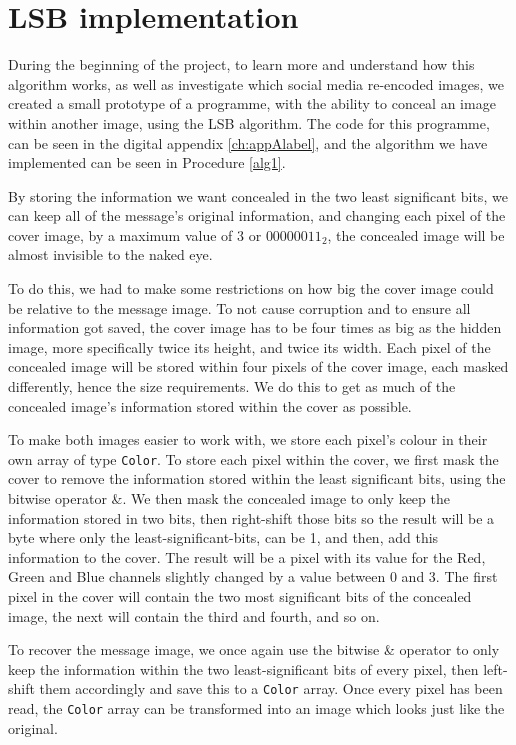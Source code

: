 \section{LSB implementation}
\label{sec:lsb-implementation}
During the beginning of the project, to learn more and understand how this algorithm works, as well as investigate which social media re-encoded images, we created a small prototype of a programme, with the ability to conceal an image within another image, using the LSB algorithm. The code for this programme, can be seen in the digital appendix \ref{ch:appAlabel}, and the algorithm we have implemented can be seen in Procedure \ref{alg1}.

By storing the information we want concealed in the two least significant bits, we can keep all of the message's original information, and changing each pixel of the cover image, by a maximum value of 3 or $00000011_2$, the concealed image will be almost invisible to the naked eye.

To do this, we had to make some restrictions on how big the cover image could be relative to the message image. 
To not cause corruption and to ensure all information got saved, the cover image has to be four times as big as the hidden image, more specifically twice its height, and twice its width. 
Each pixel of the concealed image will be stored within four pixels of the cover image, each masked differently, hence the size requirements. 
We do this to get as much of the concealed image's information stored within the cover as possible.

To make both images easier to work with, we store each pixel's colour in their own array of type \lstinline|Color|.
To store each pixel within the cover, we first mask the cover to remove the information stored within the least significant bits, using the bitwise operator \&.
We then mask the concealed image to only keep the information stored in two bits, then right-shift those bits so the result will be a byte where only the least-significant-bits, can be 1, and then, add this information to the cover. 
The result will be a pixel with its value for the Red, Green and Blue channels slightly changed by a value between 0 and 3.
The first pixel in the cover will contain the two most significant bits of the concealed image, the next will contain the third and fourth, and so on. 

To recover the message image, we once again use the bitwise \& operator to only keep the information within the two least-significant bits of every pixel, then left-shift them accordingly and save this to a \lstinline|Color| array. Once every pixel has been read, the \lstinline|Color| array can be transformed into an image which looks just like the original.

